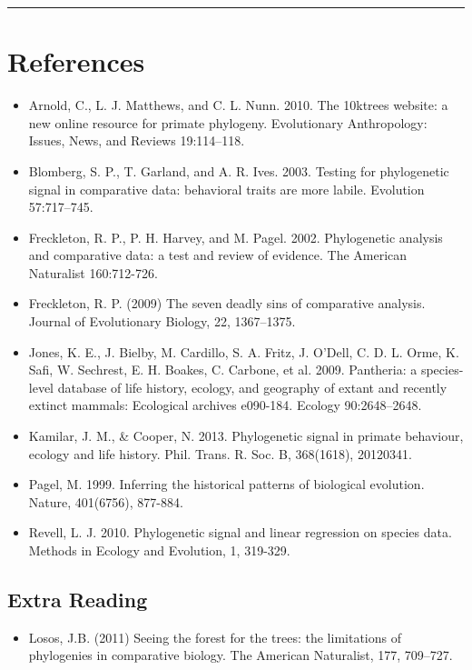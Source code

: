 \documentclass[]{book}
\providecommand{\tightlist}{%
  \setlength{\itemsep}{0pt}\setlength{\parskip}{0pt}}
\theoremstyle{definition}
\theoremstyle{definition}
\theoremstyle{definition}
\theoremstyle{remark}
\begin{document}
\begin{center}\rule{0.5\linewidth}{\linethickness}\end{center}

\section{References}\label{references-1}

\begin{itemize}
\tightlist
\item
  Arnold, C., L. J. Matthews, and C. L. Nunn. 2010. The 10ktrees
  website: a new online resource for primate phylogeny. Evolutionary
  Anthropology: Issues, News, and Reviews 19:114--118.
\item
  Blomberg, S. P., T. Garland, and A. R. Ives. 2003. Testing for
  phylogenetic signal in comparative data: behavioral traits are more
  labile. Evolution 57:717--745.
\item
  Freckleton, R. P., P. H. Harvey, and M. Pagel. 2002. Phylogenetic
  analysis and comparative data: a test and review of evidence. The
  American Naturalist 160:712-726.
\item
  Freckleton, R. P. (2009) The seven deadly sins of comparative
  analysis. Journal of Evolutionary Biology, 22, 1367--1375.
\item
  Jones, K. E., J. Bielby, M. Cardillo, S. A. Fritz, J. O'Dell, C. D. L.
  Orme, K. Safi, W. Sechrest, E. H. Boakes, C. Carbone, et al. 2009.
  Pantheria: a species-level database of life history, ecology, and
  geography of extant and recently extinct mammals: Ecological archives
  e090-184. Ecology 90:2648--2648.
\item
  Kamilar, J. M., \& Cooper, N. 2013. Phylogenetic signal in primate
  behaviour, ecology and life history. Phil. Trans. R. Soc. B,
  368(1618), 20120341.
\item
  Pagel, M. 1999. Inferring the historical patterns of biological
  evolution. Nature, 401(6756), 877-884.
\item
  Revell, L. J. 2010. Phylogenetic signal and linear regression on
  species data. Methods in Ecology and Evolution, 1, 319-329.
\end{itemize}

\subsection{Extra Reading}\label{extra-reading-1}

\begin{itemize}
\tightlist
\item
  Losos, J.B. (2011) Seeing the forest for the trees: the limitations of
  phylogenies in comparative biology. The American Naturalist, 177,
  709--727.
\end{itemize}
\end{document}
